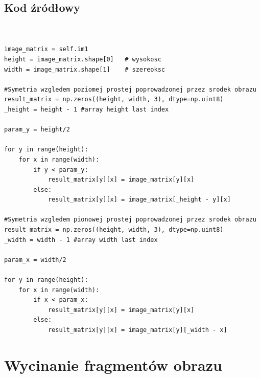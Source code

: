 \documentclass[final,a4paper,openany,12pt]{mwbk}
\begin{document}
\subsection*{Kod źródłowy}

\begin{lstlisting}[caption= Symetrie względem zadanej prostej]


image_matrix = self.im1
height = image_matrix.shape[0]   # wysokosc
width = image_matrix.shape[1]    # szereoksc

#Symetria wzgledem poziomej prostej poprowadzonej przez srodek obrazu
result_matrix = np.zeros((height, width, 3), dtype=np.uint8)
_height = height - 1 #array height last index

param_y = height/2

for y in range(height):
    for x in range(width): 
        if y < param_y:
            result_matrix[y][x] = image_matrix[y][x]
        else:
            result_matrix[y][x] = image_matrix[_height - y][x]

#Symetria wzgledem pionowej prostej poprowadzonej przez srodek obrazu
result_matrix = np.zeros((height, width, 3), dtype=np.uint8)
_width = width - 1 #array width last index

param_x = width/2

for y in range(height):
    for x in range(width): 
        if x < param_x:
            result_matrix[y][x] = image_matrix[y][x]
        else:
            result_matrix[y][x] = image_matrix[y][_width - x]

\end{lstlisting}



\section{ Wycinanie fragmentów obrazu}

\hfill
\\\\
\indent
\end{document}
